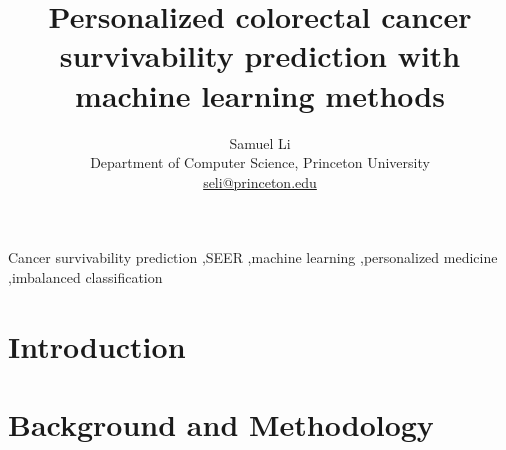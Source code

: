 \documentclass[review]{elsarticle}
\begin{document}
\begin{frontmatter}
	
\title{Personalized colorectal cancer survivability prediction with machine learning methods }
\author{Samuel Li \\ Department of Computer Science, Princeton University \\ \href{mailto:seli@princeton.edu}{seli@princeton.edu}} 






\begin{abstract}

\end{abstract}

\begin{keyword}
Cancer survivability prediction \sep SEER \sep machine learning \sep personalized medicine \sep imbalanced classification
\end{keyword}

\end{frontmatter}

\section{Introduction}



\section{Background and Methodology}
\end{document}
